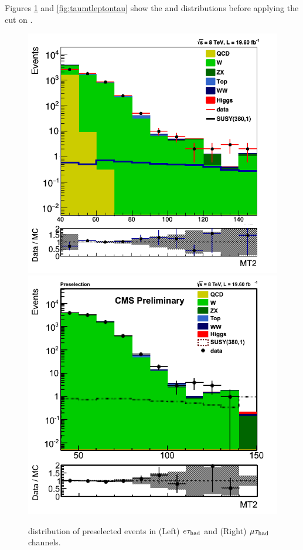 Figures \ref{fig:mt2leptontau} and \ref{fig:taumtleptontau} show the \mttwo and \tauMT distributions before applying the cut on \tauMT.
\begin{figure}[!Hhtb]
\centering
\includegraphics[angle=0,scale=0.35]{SelectionEleTau/MT2.png}
\includegraphics[angle=0,scale=0.35]{SelectionMuTau/MT2_Ratio_Preselection_unBlinded.png}
\caption{\mttwo distribution of preselected events in (Left) $e\tau_{\rm had}$ and (Right) $\mu\tau_{\rm had}$ channels.}
\label{fig:mt2leptontau}
\end{figure}


